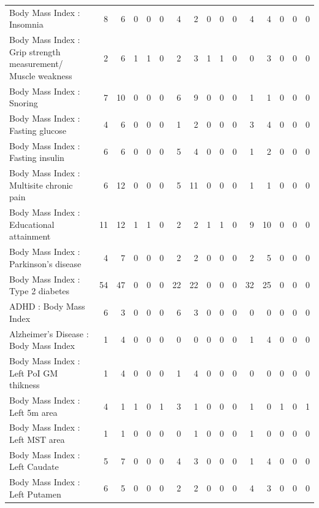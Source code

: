\begin{table}[ht]
\begin{tabular}{lrrrrrrrrrrrrrrr}
  Body Mass Index  : Insomnia &   8 &   6 &   0 &   0 &   0 &   4 &   2 &   0 &   0 &   0 &   4 &   4 &   0 &   0 &   0 \\ 
  Body Mass Index  : Grip strength measurement/ Muscle weakness &   2 &   6 &   1 &   1 &   0 &   2 &   3 &   1 &   1 &   0 &   0 &   3 &   0 &   0 &   0 \\ 
  Body Mass Index  : Snoring &   7 &  10 &   0 &   0 &   0 &   6 &   9 &   0 &   0 &   0 &   1 &   1 &   0 &   0 &   0 \\ 
  Body Mass Index  : Fasting glucose &   4 &   6 &   0 &   0 &   0 &   1 &   2 &   0 &   0 &   0 &   3 &   4 &   0 &   0 &   0 \\ 
  Body Mass Index  : Fasting insulin &   6 &   6 &   0 &   0 &   0 &   5 &   4 &   0 &   0 &   0 &   1 &   2 &   0 &   0 &   0 \\ 
  Body Mass Index  : Multisite chronic pain &   6 &  12 &   0 &   0 &   0 &   5 &  11 &   0 &   0 &   0 &   1 &   1 &   0 &   0 &   0 \\ 
  Body Mass Index  : Educational attainment &  11 &  12 &   1 &   1 &   0 &   2 &   2 &   1 &   1 &   0 &   9 &  10 &   0 &   0 &   0 \\ 
  Body Mass Index  : Parkinson's disease &   4 &   7 &   0 &   0 &   0 &   2 &   2 &   0 &   0 &   0 &   2 &   5 &   0 &   0 &   0 \\ 
  Body Mass Index  : Type 2 diabetes &  54 &  47 &   0 &   0 &   0 &  22 &  22 &   0 &   0 &   0 &  32 &  25 &   0 &   0 &   0 \\ 
  ADHD : Body Mass Index  &   6 &   3 &   0 &   0 &   0 &   6 &   3 &   0 &   0 &   0 &   0 &   0 &   0 &   0 &   0 \\ 
  Alzheimer's Disease : Body Mass Index  &   1 &   4 &   0 &   0 &   0 &   0 &   0 &   0 &   0 &   0 &   1 &   4 &   0 &   0 &   0 \\ 
  Body Mass Index  : Left PoI GM thikness &   1 &   4 &   0 &   0 &   0 &   1 &   4 &   0 &   0 &   0 &   0 &   0 &   0 &   0 &   0 \\ 
  Body Mass Index  : Left 5m area &   4 &   1 &   1 &   0 &   1 &   3 &   1 &   0 &   0 &   0 &   1 &   0 &   1 &   0 &   1 \\ 
  Body Mass Index  : Left MST area &   1 &   1 &   0 &   0 &   0 &   0 &   1 &   0 &   0 &   0 &   1 &   0 &   0 &   0 &   0 \\ 
  Body Mass Index  : Left Caudate &   5 &   7 &   0 &   0 &   0 &   4 &   3 &   0 &   0 &   0 &   1 &   4 &   0 &   0 &   0 \\ 
  Body Mass Index  : Left Putamen &   6 &   5 &   0 &   0 &   0 &   2 &   2 &   0 &   0 &   0 &   4 &   3 &   0 &   0 &   0 \\ 

\end{tabular}
\end{table}
